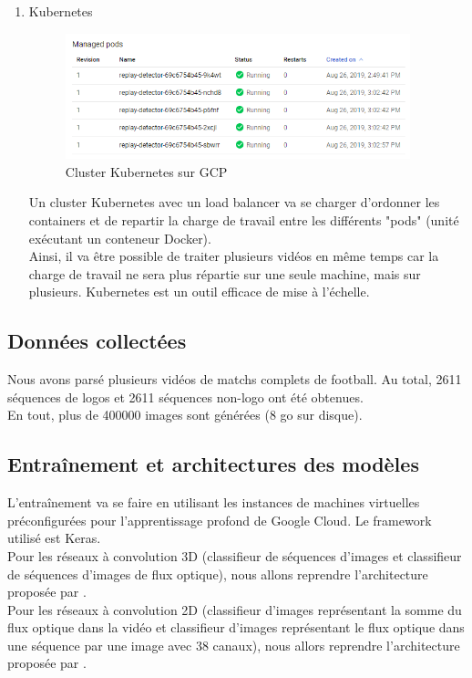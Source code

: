 \documentclass[11pt]{article}
\begin{document}
\begin{enumerate}
\item Kubernetes
\label{sec:org29347bb}
\begin{figure}[htbp]
\centering
\includegraphics[width=10cm]{kubernetes_pods.png}
\caption{Cluster Kubernetes sur GCP}
\end{figure}
Un cluster Kubernetes avec un load balancer va se charger d'ordonner les containers et de repartir la charge de travail entre les différents "pods" (unité exécutant un conteneur Docker).\\
Ainsi, il va être possible de traiter plusieurs vidéos en même temps car la charge de travail ne sera plus répartie sur une seule machine, mais sur plusieurs. Kubernetes est un outil efficace de mise à l'échelle.\\
\end{enumerate}
\subsection{Données collectées}
\label{sec:org693aa1c}
Nous avons parsé plusieurs vidéos de matchs complets de football. Au total, 2611 séquences de logos et 2611 séquences non-logo ont été obtenues.\\
En tout, plus de 400000 images sont générées (8 go sur disque).\\
\subsection{Entraînement et architectures des modèles}
\label{sec:orga879805}
L'entraînement va se faire en utilisant les instances de machines virtuelles préconfigurées pour l'apprentissage profond de Google Cloud. Le framework utilisé est Keras.\\
Pour les réseaux à convolution 3D (classifieur de séquences d'images et classifieur de séquences d'images de flux optique), nous allons reprendre l'architecture proposée par \cite{Tran_2015}.\\
Pour les réseaux à convolution 2D (classifieur d'images représentant la somme du flux optique dans la vidéo et classifieur d'images représentant le flux optique dans une séquence par une image avec 38 canaux), nous allors reprendre l'architecture proposée par \cite{DBLP:journals/corr/SimonyanZ14}.\\
\end{document}

